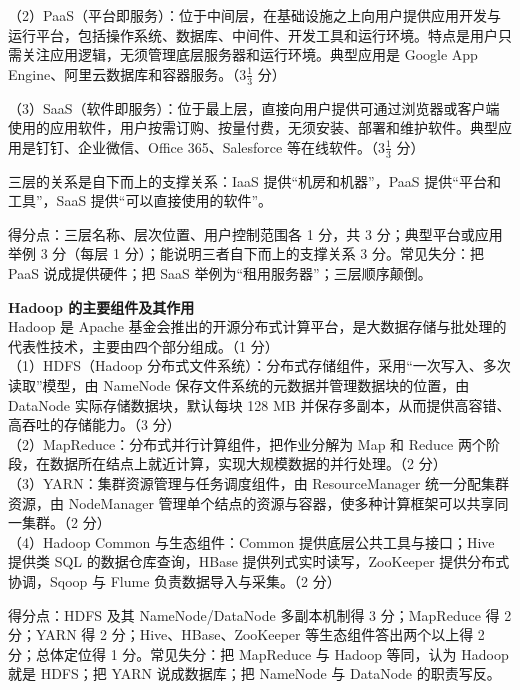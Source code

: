 \documentclass[a4paper,11pt]{article}
\begin{document}
（2）PaaS（平台即服务）：位于中间层，在基础设施之上向用户提供应用开发与运行平台，包括操作系统、数据库、中间件、开发工具和运行环境。特点是用户只需关注应用逻辑，无须管理底层服务器和运行环境。典型应用是 Google App Engine、阿里云数据库和容器服务。（3$\frac{1}{3}$ 分）

（3）SaaS（软件即服务）：位于最上层，直接向用户提供可通过浏览器或客户端使用的应用软件，用户按需订购、按量付费，无须安装、部署和维护软件。典型应用是钉钉、企业微信、Office 365、Salesforce 等在线软件。（3$\frac{1}{3}$ 分）

三层的关系是自下而上的支撑关系：IaaS 提供“机房和机器”，PaaS 提供“平台和工具”，SaaS 提供“可以直接使用的软件”。
\begin{analysis}得分点：三层名称、层次位置、用户控制范围各 1 分，共 3 分；典型平台或应用举例 3 分（每层 1 分）；能说明三者自下而上的支撑关系 3 分。常见失分：把 PaaS 说成提供硬件；把 SaaS 举例为“租用服务器”；三层顺序颠倒。\end{analysis}

\q \textbf{Hadoop 的主要组件及其作用}\\
Hadoop 是 Apache 基金会推出的开源分布式计算平台，是大数据存储与批处理的代表性技术，主要由四个部分组成。（1 分）\\
（1）HDFS（Hadoop 分布式文件系统）：分布式存储组件，采用“一次写入、多次读取”模型，由 NameNode 保存文件系统的元数据并管理数据块的位置，由 DataNode 实际存储数据块，默认每块 128 MB 并保存多副本，从而提供高容错、高吞吐的存储能力。（3 分）\\
（2）MapReduce：分布式并行计算组件，把作业分解为 Map 和 Reduce 两个阶段，在数据所在结点上就近计算，实现大规模数据的并行处理。（2 分）\\
（3）YARN：集群资源管理与任务调度组件，由 ResourceManager 统一分配集群资源，由 NodeManager 管理单个结点的资源与容器，使多种计算框架可以共享同一集群。（2 分）\\
（4）Hadoop Common 与生态组件：Common 提供底层公共工具与接口；Hive 提供类 SQL 的数据仓库查询，HBase 提供列式实时读写，ZooKeeper 提供分布式协调，Sqoop 与 Flume 负责数据导入与采集。（2 分）
\begin{analysis}得分点：HDFS 及其 NameNode/DataNode 多副本机制得 3 分；MapReduce 得 2 分；YARN 得 2 分；Hive、HBase、ZooKeeper 等生态组件答出两个以上得 2 分；总体定位得 1 分。常见失分：把 MapReduce 与 Hadoop 等同，认为 Hadoop 就是 HDFS；把 YARN 说成数据库；把 NameNode 与 DataNode 的职责写反。\end{analysis}
\end{document}
